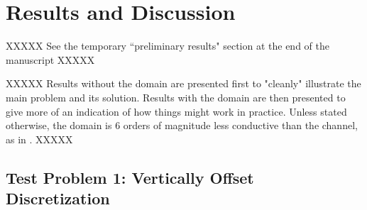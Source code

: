 \documentclass{article}
\begin{document}
\section{Results and Discussion}

XXXXX See the temporary ``preliminary results" section at the end of the manuscript XXXXX

XXXXX Results without the domain are presented first to "cleanly" illustrate the main problem and its solution. Results with the domain are then presented to give more of an indication of how things might work in practice. Unless stated otherwise, the domain is 6 orders of magnitude less conductive than the channel, as in \cite{bardot2022}. XXXXX

\subsection{Test Problem 1: Vertically Offset Discretization}
\end{document}
